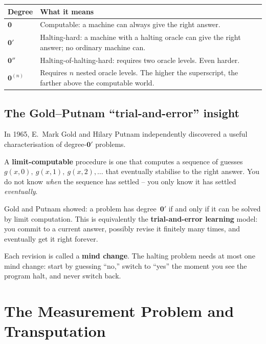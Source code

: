 \documentclass[11pt,a4paper]{article}
\newcommand{\term}[1]{\textbf{#1}}
\newcommand{\zerp}{\mathbf{0}'}
\newcommand{\zer}{\mathbf{0}}
\newcommand{\zerpp}{\mathbf{0}''}
\begin{document}
\begin{tcolorbox}[colback=boxgreen,colframe=green!50!black,
  title=Plain English Summary of the Degree Hierarchy]
\begin{tabular}{@{}lp{8.8cm}@{}}
\toprule
Degree & What it means \\
\midrule
$\zer$   & Computable: a machine can always give the right answer. \\
$\zerp$  & Halting-hard: a machine with a halting oracle can give the right
           answer; no ordinary machine can. \\
$\zerpp$ & Halting-of-halting-hard: requires two oracle levels.
           Even harder. \\
$\zer^{(n)}$ & Requires $n$ nested oracle levels. The higher the superscript,
               the farther above the computable world. \\
\bottomrule
\end{tabular}
\end{tcolorbox}

\subsection{The Gold--Putnam ``trial-and-error'' insight}

In 1965, E.\ Mark Gold and Hilary Putnam independently discovered a useful
characterisation of degree-$\zerp$ problems.

A \term{limit-computable} procedure is one that computes a sequence of
guesses $g(x, 0),\allowbreak\ g(x, 1),\allowbreak\ g(x, 2), \ldots$ that
eventually stabilise
to the right answer. You do not know \emph{when} the sequence has settled --
you only know it has settled \emph{eventually}.

Gold and Putnam showed: a problem has degree~$\zerp$ if and only if it can
be solved by limit computation. This is equivalently the \term{trial-and-error
learning} model: you commit to a current answer, possibly revise it finitely
many times, and eventually get it right forever.

Each revision is called a \term{mind change}. The halting problem needs at
most one mind change: start by guessing ``no,'' switch to ``yes'' the moment
you see the program halt, and never switch back.

\section{The Measurement Problem and Transputation}
\label{sec:measurement}
\end{document}
